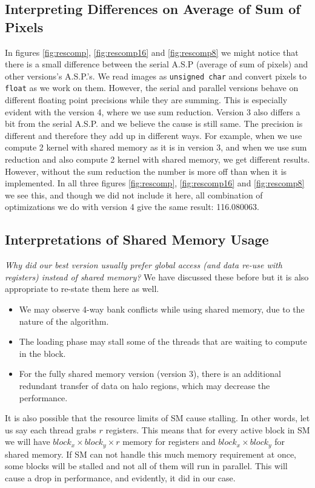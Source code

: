 \documentclass[12pt,reqno]{amsart}
\newcommand{\code}[1]{\texttt{#1}}
\begin{document}
\subsection{Interpreting Differences on Average of Sum of Pixels}
In figures \ref{fig:rescomp}, \ref{fig:rescomp16} and \ref{fig:rescomp8} we might notice that there is a small difference between the serial A.S.P (average of sum of pixels) and other versions's A.S.P.'s. We read images as \code{unsigned char} and convert pixels to \code{float} as we work on them. However, the serial and parallel versions behave on different floating point precisions while they are summing. This is especially evident with the version 4, where we use sum reduction. Version 3 also differs a bit from the serial A.S.P. and we believe the cause is still same. The precision is different and therefore they add up in different ways. For example, when we use compute 2 kernel with shared memory as it is in version 3, and when we use sum reduction and also compute 2 kernel with shared memory, we get different results. However, without the sum reduction the number is more off than when it is implemented. In all three figures \ref{fig:rescomp}, \ref{fig:rescomp16} and \ref{fig:rescomp8} we see this, and though we did not include it here, all combination of optimizations we do with version 4 give the same result: 116.080063.

\subsection{Interpretations of Shared Memory Usage}
\textit{Why did our best version usually prefer global access (and data re-use with registers) instead of shared memory?} We have discussed these before but it is also appropriate to re-state them here as well. 
\begin{itemize}
	\item We may observe 4-way bank conflicts while using shared memory, due to the nature of the algorithm.
	\item The loading phase may stall some of the threads that are waiting to compute in the block.
	\item For the fully shared memory version (version 3), there is an additional redundant transfer of data on halo regions, which may decrease the performance.
\end{itemize}
It is also possible that the resource limits of SM cause stalling. In other words, let us say each thread grabs $r$ registers. This means that for every active block in SM we will have $block_x\times block_y \times r$ memory for registers and $block_x\times block_y$ for shared memory. If SM can not handle this much memory requirement at once, some blocks will be stalled and not all of them will run in parallel. This will cause a drop in performance, and evidently, it did in our case.
\end{document}
